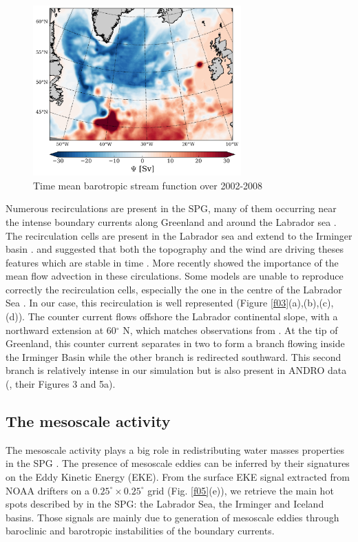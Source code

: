 \documentclass[os, manuscript]{copernicus}
\begin{document}
\begin{figure}[t]
\includegraphics[width=8cm]{../fig_os/f04.pdf}
\caption{Time mean barotropic stream function over 2002-2008}
\label{f04}
\end{figure}

Numerous recirculations are present in the SPG, many of them occurring near the intense boundary currents along Greenland and around the Labrador sea \citep{reverdin2003, flatau2003,cuny2002}. The recirculation cells are present in the Labrador sea \citep{lavender2000,cuny2002} and extend to the Irminger basin \citep{Holliday2009}. \citet{kase2001} and \citet{spall2003} suggested that both the topography and the wind are driving theses features which are stable in time \citep{palter2016}. More recently \citet{wang2017} showed the importance of the mean flow advection in these circulations. Some models are unable to reproduce correctly the recirculation cells, especially the one in the centre of the Labrador Sea \citep{treguier2005}. In our case, this recirculation is well represented (Figure \ref{f03}(a),(b),(c),(d)). The counter current flows offshore the Labrador continental slope, with a northward extension at 60$^{\circ}$ N, which matches observations from \citet{lavender2005}.  At the tip of Greenland, this counter current separates in two to form a branch flowing inside the Irminger Basin while the other branch is redirected southward. This second branch is relatively intense in our simulation but is also present in ANDRO data (\cite{fischer2018}, their Figures 3 and 5a).  

\subsection{The mesoscale activity}

The mesoscale activity plays a big role in redistributing water masses properties in the SPG \citep{brandt2004,dejong2016,zhao2018b}. The presence of mesoscale eddies can be inferred by their signatures on the Eddy Kinetic Energy (EKE). From the surface EKE signal extracted from NOAA drifters on a $0.25^{\circ}\times 0.25^{\circ}$ grid (Fig. \ref{f05}(e)), we retrieve the main hot spots described by \citet{flatau2003} in the SPG: the Labrador Sea, the Irminger and Iceland basins. Those signals are mainly due to generation of mesoscale eddies through baroclinic and barotropic instabilities of the boundary currents.
\end{document}
